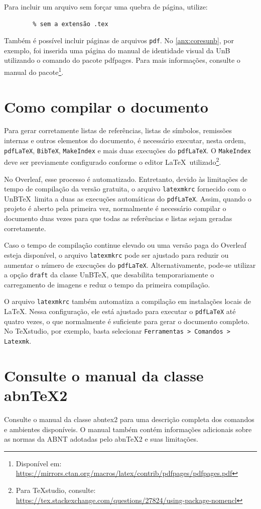 Para incluir um arquivo sem forçar uma quebra de página, utilize:
\begin{verbatim}
        % sem a extensão .tex
\end{verbatim}

Também é possível incluir páginas de arquivos \texttt{pdf}. No \cref{anx:coresunb}, por exemplo, foi inserida uma página do manual de identidade visual da UnB utilizando o comando \verb|| do pacote \textsf{pdfpages}. Para mais informações, consulte o manual do pacote\footnote{Disponível em: \url{https://mirrors.ctan.org/macros/latex/contrib/pdfpages/pdfpages.pdf}}.

\section{Como compilar o documento}\label{sec:compilar}

Para gerar corretamente listas de referências, listas de símbolos, remissões internas e outros elementos do documento, é necessário executar, nesta ordem, \texttt{pdfLaTeX}, \texttt{BibTeX}, \texttt{MakeIndex} e mais duas execuções do \texttt{pdfLaTeX}. O \texttt{MakeIndex} deve ser previamente configurado conforme o editor \LaTeX\ utilizado\footnote{Para TeXstudio, consulte: \url{https://tex.stackexchange.com/questions/27824/using-package-nomencl}}.

No Overleaf, esse processo é automatizado. Entretanto, devido às limitações de tempo de compilação da versão gratuita, o arquivo \texttt{latexmkrc} fornecido com o UnB\TeX\ limita a duas as execuções automáticas do \texttt{pdfLaTeX}. Assim, quando o projeto é aberto pela primeira vez, normalmente é necessário compilar o documento duas vezes para que todas as referências e listas sejam geradas corretamente.

Caso o tempo de compilação continue elevado ou uma versão paga do Overleaf esteja disponível, o arquivo \texttt{latexmkrc} pode ser ajustado para reduzir ou aumentar o número de execuções do \texttt{pdfLaTeX}. Alternativamente, pode-se utilizar a opção \texttt{draft} da classe UnB\TeX, que desabilita temporariamente o carregamento de imagens e reduz o tempo da primeira compilação.

O arquivo \texttt{latexmkrc} também automatiza a compilação em instalações locais de \LaTeX. Nessa configuração, ele está ajustado para executar o \texttt{pdfLaTeX} até quatro vezes, o que normalmente é suficiente para gerar o documento completo. No TeXstudio, por exemplo, basta selecionar \texttt{Ferramentas > Comandos > Latexmk}.

\section{Consulte o manual da classe abn\TeX2}

Consulte o manual da classe \textsf{abntex2} \cite{abntex2classe} para uma descrição completa dos comandos e ambientes disponíveis. O manual também contém informações adicionais sobre as normas da ABNT adotadas pelo abn\TeX2 e suas limitações.
